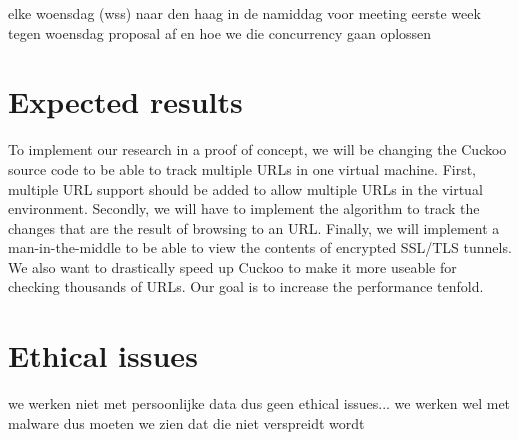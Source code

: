 \documentclass{scrartcl}
\begin{document}
elke woensdag (wss) naar den haag in de namiddag voor meeting
eerste week tegen woensdag proposal af en hoe we die concurrency gaan oplossen
 

\section{Expected results}

To implement our research in a proof of concept, we will be changing the Cuckoo source code to be able to track multiple URLs in one virtual machine. First, multiple URL support should be added to allow multiple URLs in the virtual environment. Secondly, we will have to implement the algorithm to track the changes that are the result of browsing to an URL. Finally, we will implement a man-in-the-middle to be able to view the contents of encrypted SSL/TLS tunnels.\\

We also want to drastically speed up Cuckoo to make it more useable for checking thousands of URLs. Our goal is to increase the performance tenfold.

%
%

\section{Ethical issues}

	we werken niet met persoonlijke data dus geen ethical issues...
	we werken wel met malware dus moeten we zien dat die niet verspreidt wordt



\end{document}

